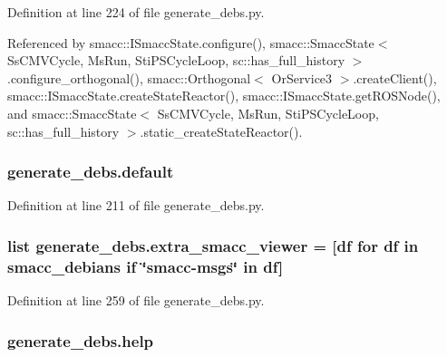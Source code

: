Definition at line 224 of file generate\+\_\+debs.\+py.



Referenced by smacc\+::\+I\+Smacc\+State.\+configure(), smacc\+::\+Smacc\+State$<$ Ss\+C\+M\+V\+Cycle, Ms\+Run, Sti\+P\+S\+Cycle\+Loop, sc\+::has\+\_\+full\+\_\+history $>$.\+configure\+\_\+orthogonal(), smacc\+::\+Orthogonal$<$ Or\+Service3 $>$.\+create\+Client(), smacc\+::\+I\+Smacc\+State.\+create\+State\+Reactor(), smacc\+::\+I\+Smacc\+State.\+get\+R\+O\+S\+Node(), and smacc\+::\+Smacc\+State$<$ Ss\+C\+M\+V\+Cycle, Ms\+Run, Sti\+P\+S\+Cycle\+Loop, sc\+::has\+\_\+full\+\_\+history $>$.\+static\+\_\+create\+State\+Reactor().

\subsubsection[{\texorpdfstring{default}{default}}]{\setlength{\rightskip}{0pt plus 5cm}generate\+\_\+debs.\+default}\hypertarget{namespacegenerate__debs_a3d67a92b7eb3a59c397dc9fdd1c67558}{}\label{namespacegenerate__debs_a3d67a92b7eb3a59c397dc9fdd1c67558}


Definition at line 211 of file generate\+\_\+debs.\+py.

\subsubsection[{\texorpdfstring{extra\+\_\+smacc\+\_\+viewer}{extra_smacc_viewer}}]{\setlength{\rightskip}{0pt plus 5cm}list generate\+\_\+debs.\+extra\+\_\+smacc\+\_\+viewer = \mbox{[}df for df in {\bf smacc\+\_\+debians} if \char`\"{}smacc-\/msgs\char`\"{} in df\mbox{]}}\hypertarget{namespacegenerate__debs_aae153eaf5f6cddad5899c36fef7e1b10}{}\label{namespacegenerate__debs_aae153eaf5f6cddad5899c36fef7e1b10}


Definition at line 259 of file generate\+\_\+debs.\+py.

\subsubsection[{\texorpdfstring{help}{help}}]{\setlength{\rightskip}{0pt plus 5cm}generate\+\_\+debs.\+help}\hypertarget{namespacegenerate__debs_ab09f4294da5036d5f6881672de9ed9c7}{}\label{namespacegenerate__debs_ab09f4294da5036d5f6881672de9ed9c7}


